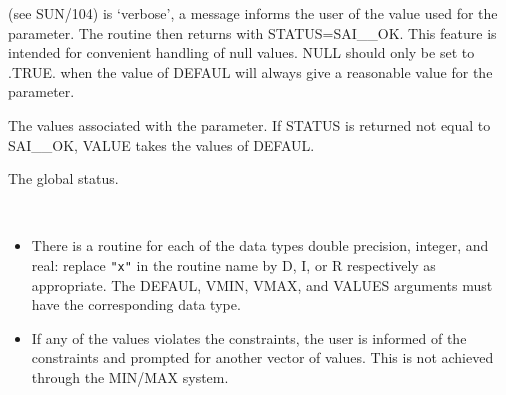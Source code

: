 \documentclass[twoside,11pt]{article}
\newcommand{\latex}[1]{#1}
\newcommand{\sstsubsection}[1]{ \item[{#1}] \mbox{} \\}
\newcommand{\sstnotes}[1]{\item[Notes:] \mbox{} \\[1.3ex] #1}
\newcommand{\sstitemlist}[1]{
  \mbox{} \\
  \vspace{-7ex}
  \begin{itemize}
     #1
  \end{itemize}
}
\newcommand{\sstitem}{\item}
\renewcommand{\sstsubsection}[1]{\item[{#1}]}
\renewcommand{\sstnotes}[1]{\item[Notes:]
      \begin{description}
         #1
      \end{description}
   }
\newcommand{\sstitemlist}[1]{
      \begin{itemize}
         #1
      \end{itemize}
   }
\begin{document}
{{{\latex{ (see SUN/104)} is `verbose',
         a message informs the user of the value used for
         the parameter. The routine then returns with STATUS=SAI\_\_OK. 
         This feature is intended for convenient handling of null values.
         NULL should only be set to .TRUE. when the value of DEFAUL will
         always give a reasonable value for the parameter.
      }
      \sstsubsection{
         VALUES( NVALS ) = ? (Returned)
      }{
         The values associated with the parameter.  If STATUS is
         returned not equal to SAI\_\_OK, VALUE takes the values of
         DEFAUL.
      }
      \sstsubsection{
         STATUS = INTEGER (Given and Returned)
      }{
         The global status.
      }
   }
   \sstnotes{
      \sstitemlist{

         \sstitem
         There is a routine for each of the data types double precision,
         integer, and real: replace {\tt "x"} in the routine name by D, I, or R
         respectively as appropriate.  The DEFAUL, VMIN, VMAX, and VALUES
         arguments must have the corresponding data type.

         \sstitem
         If any of the values violates the constraints, the user is
         informed of the constraints and prompted for another vector of
         values.  This is not achieved through the MIN/MAX system.
      }
   }
}
\end{document}
